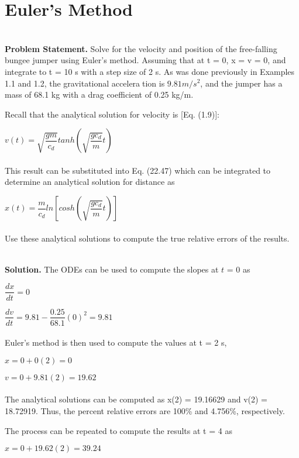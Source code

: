 \vspace{0,3in}
\chapter{Euler’s Method}
\vspace{0,1in}
\hline\\
\vspace{0,1in}
\textbf{Problem Statement.} Solve for the velocity and position of the free-falling bungee jumper
using Euler’s method. Assuming that at t = 0, x = v = 0, and integrate to t = 10 s with a
step size of 2 s. As was done previously in Examples 1.1 and 1.2, the gravitational acceleration is $9.81 m/s^2$, and the jumper has a mass of 68.1 kg with a drag coefficient of 0.25 kg/m. 

Recall that the analytical solution for velocity is [Eq. (1.9)]:

$v(t) = \sqrt{\dfrac{gm}{c_{d}}} tanh \left( \sqrt{\dfrac{gc_d}{m}}t \right)$\\
\\
This result can be substituted into Eq. (22.47) which can be integrated to determine an
analytical solution for distance as

$x(t) = \dfrac{m}{c_d} ln \left[ cosh \left( \sqrt{\dfrac{gc_d}{m}}t \right) \right]$\\
\\
Use these analytical solutions to compute the true relative errors of the results.

\vspace{0.2in}\\
\textbf{Solution.} The ODEs can be used to compute the slopes at $t$ = 0 as

$\dfrac{dx}{dt} = 0$

$\dfrac{dv}{dt} = 9.81 - \dfrac{0.25}{68.1} (0)^2 = 9.81$\\
\\
Euler’s method is then used to compute the values at t = 2 s,

$x = 0 + 0(2) = 0$

$v = 0 + 9.81(2) = 19.62$\\
\\
The analytical solutions can be computed as x(2) = 19.16629 and v(2) = 18.72919. Thus,
the percent relative errors are 100\% and 4.756\%, respectively.

The process can be repeated to compute the results at t = 4 as

$x = 0 + 19.62(2) = 39.24$

